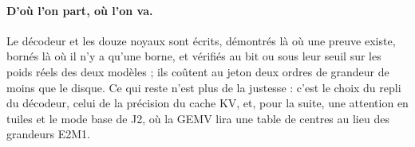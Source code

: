 \paragraph{D'où l'on part, où l'on va.} Le décodeur et les douze noyaux sont écrits, démontrés là où une preuve existe, bornés là où il n'y a qu'une borne, et vérifiés au bit ou sous leur seuil sur les poids réels des deux modèles ; ils coûtent au jeton deux ordres de grandeur de moins que le disque. Ce qui reste n'est plus de la justesse : c'est le choix du repli du décodeur, celui de la précision du cache KV, et, pour la suite, une attention en tuiles et le mode base de J2, où la GEMV lira une table de centres au lieu des grandeurs E2M1.

